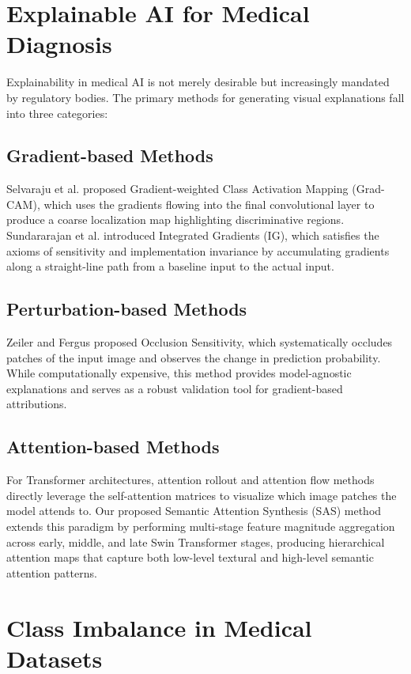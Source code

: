 \documentclass[12pt,a4paper]{report}
\begin{document}
\section{Explainable AI for Medical Diagnosis}

Explainability in medical AI is not merely desirable but increasingly mandated by regulatory bodies. The primary methods for generating visual explanations fall into three categories:

\subsection{Gradient-based Methods}
Selvaraju et al. \cite{selvaraju2017gradcam} proposed Gradient-weighted Class Activation Mapping (Grad-CAM), which uses the gradients flowing into the final convolutional layer to produce a coarse localization map highlighting discriminative regions. Sundararajan et al. \cite{sundararajan2017axiomatic} introduced Integrated Gradients (IG), which satisfies the axioms of sensitivity and implementation invariance by accumulating gradients along a straight-line path from a baseline input to the actual input.

\subsection{Perturbation-based Methods}
Zeiler and Fergus \cite{zeiler2014visualizing} proposed Occlusion Sensitivity, which systematically occludes patches of the input image and observes the change in prediction probability. While computationally expensive, this method provides model-agnostic explanations and serves as a robust validation tool for gradient-based attributions.

\subsection{Attention-based Methods}
For Transformer architectures, attention rollout \cite{abnar2020quantifying} and attention flow methods directly leverage the self-attention matrices to visualize which image patches the model attends to. Our proposed Semantic Attention Synthesis (SAS) method extends this paradigm by performing multi-stage feature magnitude aggregation across early, middle, and late Swin Transformer stages, producing hierarchical attention maps that capture both low-level textural and high-level semantic attention patterns.

\section{Class Imbalance in Medical Datasets}
\end{document}
